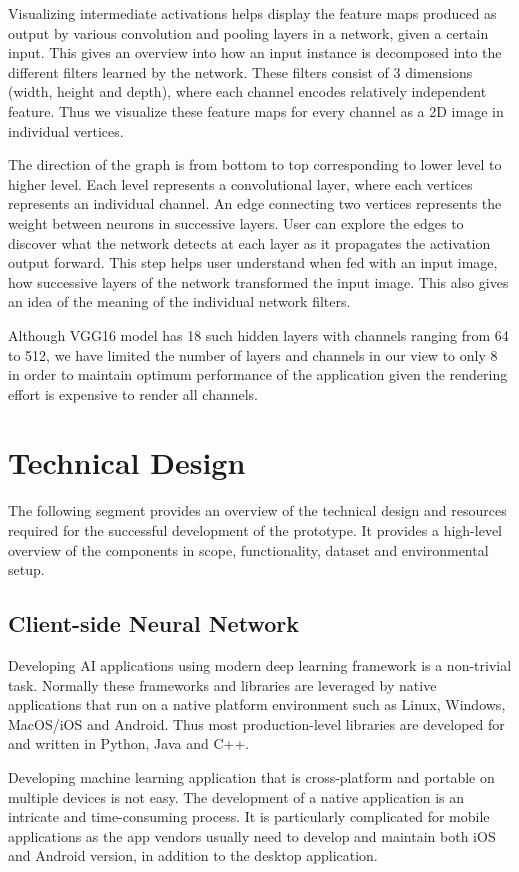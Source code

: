 Visualizing intermediate activations helps display the feature maps produced as output by various convolution and pooling layers in a network, given a certain input. This gives an overview into how an input instance is decomposed into the different filters learned by the network. These filters consist of 3 dimensions (width, height and depth), where each channel encodes relatively independent feature. Thus we visualize these feature maps for every channel as a 2D image in individual vertices.

The direction of the graph is from bottom to top corresponding to lower level to higher level. Each level represents a convolutional layer, where each vertices represents an individual channel. An edge connecting two vertices represents the weight between neurons in successive layers. User can explore the edges to discover what the network detects at each layer as it propagates the activation output forward. This step helps user understand when fed with an input image, how successive layers of the network transformed the input image. This also gives an idea of the meaning of the individual network filters.

Although VGG16 model has 18 such hidden layers with channels ranging from 64 to 512, we have limited the number of layers and channels in our view to only 8 in order to maintain optimum performance of the application given the rendering effort is expensive to render all channels.

\section{Technical Design}
The following segment provides an overview of the technical design and resources required for the successful development of the prototype. It provides a high-level overview of the components in scope, functionality, dataset and environmental setup.

\subsection{Client-side Neural Network}
Developing AI applications using modern deep learning framework is a non-trivial task. Normally these frameworks and libraries are leveraged by native applications that run on a native platform environment such as Linux, Windows, MacOS/iOS and Android. Thus most production-level libraries are developed for and written in Python, Java and C++.

Developing machine learning application that is cross-platform and portable on multiple devices is not easy. The development of a native application is an intricate and time-consuming process. It is particularly complicated for mobile applications as the app vendors usually need to develop and maintain both iOS and Android version, in addition to the desktop application.


